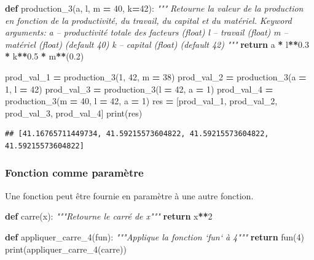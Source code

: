 \documentclass[12pt,]{book}
\newenvironment{Shaded}{\begin{snugshade}}{\end{snugshade}}
\newcommand{\KeywordTok}[1]{\textcolor[rgb]{0.13,0.29,0.53}{\textbf{#1}}}
\newcommand{\DecValTok}[1]{\textcolor[rgb]{0.00,0.00,0.81}{#1}}
\newcommand{\FloatTok}[1]{\textcolor[rgb]{0.00,0.00,0.81}{#1}}
\newcommand{\CommentTok}[1]{\textcolor[rgb]{0.56,0.35,0.01}{\textit{#1}}}
\newcommand{\ControlFlowTok}[1]{\textcolor[rgb]{0.13,0.29,0.53}{\textbf{#1}}}
\newcommand{\OperatorTok}[1]{\textcolor[rgb]{0.81,0.36,0.00}{\textbf{#1}}}
\newcommand{\BuiltInTok}[1]{#1}
\newcommand{\NormalTok}[1]{#1}
\numberwithin{equation}{section}
\numberwithin{countremarque}{section}
\begin{document}
\begin{Shaded}
\begin{Highlighting}[]
\KeywordTok{def}\NormalTok{ production_3(a, l, m }\OperatorTok{=} \DecValTok{40}\NormalTok{, k}\OperatorTok{=}\DecValTok{42}\NormalTok{):}
  \CommentTok{"""}
\CommentTok{  Retourne la valeur de la production en fonction}
\CommentTok{  de la productivité, du travail, du capital et du matériel.}
\CommentTok{  }
\CommentTok{  Keyword arguments:}
\CommentTok{  a -- productivité totale des facteurs (float)}
\CommentTok{  l -- travail (float)}
\CommentTok{  m -- matériel (float) (default 40)}
\CommentTok{  k -- capital (float) (default 42)}
\CommentTok{  """}
  \ControlFlowTok{return}\NormalTok{ a }\OperatorTok{*}\NormalTok{ l}\OperatorTok{**}\FloatTok{0.3} \OperatorTok{*}\NormalTok{ k}\OperatorTok{**}\FloatTok{0.5} \OperatorTok{*}\NormalTok{ m}\OperatorTok{**}\NormalTok{(}\FloatTok{0.2}\NormalTok{)}
  
\NormalTok{prod_val_1 }\OperatorTok{=}\NormalTok{ production_3(}\DecValTok{1}\NormalTok{, }\DecValTok{42}\NormalTok{, m }\OperatorTok{=} \DecValTok{38}\NormalTok{)}
\NormalTok{prod_val_2 }\OperatorTok{=}\NormalTok{ production_3(a }\OperatorTok{=} \DecValTok{1}\NormalTok{, l }\OperatorTok{=} \DecValTok{42}\NormalTok{)}
\NormalTok{prod_val_3 }\OperatorTok{=}\NormalTok{ production_3(l }\OperatorTok{=} \DecValTok{42}\NormalTok{, a }\OperatorTok{=} \DecValTok{1}\NormalTok{)}
\NormalTok{prod_val_4 }\OperatorTok{=}\NormalTok{ production_3(m }\OperatorTok{=} \DecValTok{40}\NormalTok{, l }\OperatorTok{=} \DecValTok{42}\NormalTok{, a }\OperatorTok{=} \DecValTok{1}\NormalTok{)}
\NormalTok{res }\OperatorTok{=}\NormalTok{ [prod_val_1, prod_val_2, prod_val_3, prod_val_4]}
\BuiltInTok{print}\NormalTok{(res)}
\end{Highlighting}
\end{Shaded}

\begin{lstlisting}
## [41.16765711449734, 41.59215573604822, 41.59215573604822, 41.59215573604822]
\end{lstlisting}

\subsubsection{Fonction comme paramètre}\label{fonction-comme-parametre}

Une fonction peut être fournie en paramètre à une autre fonction.

\begin{Shaded}
\begin{Highlighting}[]
\KeywordTok{def}\NormalTok{ carre(x):}
  \CommentTok{"""Retourne le carré de x"""}
  \ControlFlowTok{return}\NormalTok{ x}\OperatorTok{**}\DecValTok{2}
  
\KeywordTok{def}\NormalTok{ appliquer_carre_4(fun):}
  \CommentTok{"""Applique la fonction `fun` à 4"""}
  \ControlFlowTok{return}\NormalTok{ fun(}\DecValTok{4}\NormalTok{)}
\BuiltInTok{print}\NormalTok{(appliquer_carre_4(carre))}
\end{Highlighting}
\end{Shaded}
\end{document}
